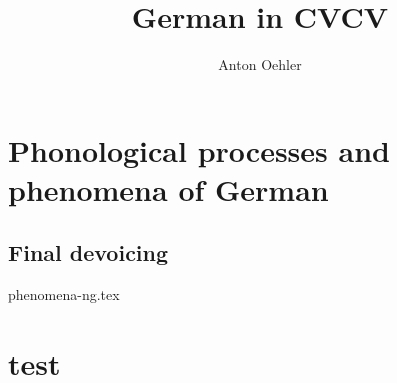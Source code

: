 \documentclass[
]{scrartcl}
\title{German in CVCV}
\author{Anton Oehler}
\begin{document}
\maketitle

\begin{abstract}

\end{abstract}

\section{Phonological processes and phenomena of German}
\subsection{Final devoicing}
{phenomena-ng.tex}

\section{test}
 
\begin{structure}
    \wordstart
    \V{\textschwa}
    \fen

\end{structure}

\begin{structure}
    \wordstart
    \emptyV
    \V[floating]{\textschwa}
    \fen

\end{structure}
\end{document}
